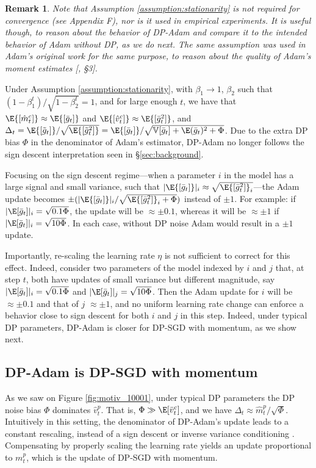 \documentclass[letterpaper]{article} %
\newtheorem*{remark}{Remark}
\def\V{\mathbb{V}}
\begin{document}
\begin{remark}
    Note that Assumption \ref{assumption:stationarity} is not required for convergence (see Appendix F), nor is it used in empirical experiments. It is useful though, to reason about the behavior of DP-Adam and compare it to the intended behavior of Adam without DP, as we do next. The same assumption was used in Adam's original work for the same purpose, to reason about the quality of Adam's moment estimates [\cite{orig_adam}, \S3].
\end{remark}

Under Assumption \ref{assumption:stationarity}, with $\beta_1 \rightarrow 1$, $\beta_2$ such that $(1-\beta_1^{t})/{\sqrt{1-\beta_2^{t}}} = 1$, and for large enough $t$, we have that $\E{[\hat{m}_t^{c}]} \approx \E{[\bar{g}_t]}$ and $\E{[\hat{v}_t^{c}]} \approx \E{[\bar{g}_t^{2}]}$, and $\Delta_t =
\E{[\tilde{g}_t]} / \sqrt{\E{[\tilde{g}_t^2]}} = \E{[\bar{g}_t]} / \sqrt{\V{[\bar{g}_t]+\E(\bar{g}_t)^2}+\Phi}$.
Due to the extra DP bias $\Phi$ in the denominator of Adam's estimator, DP-Adam no longer follows the sign descent interpretation seen in \S\ref{sec:background}.


Focusing on the sign descent regime---when a parameter $i$ in the model has a large signal and small variance, such that $|\E{[\bar{g}_t]}|_i \approx \sqrt{\E{[\bar{g}^2_t]}_i}$---the Adam update becomes $\pm (|\E{[\bar{g}_t]}|_i / \sqrt{\E{[\bar{g}^2_t]}_{i} + \Phi})$ instead of $\pm 1$.
%
For example: if $|\E[\bar{g}_t]|_i=\sqrt{0.1\Phi}$, the update will be $\approx \pm 0.1$, whereas it will be $\approx \pm 1$ if $|\E[\bar{g}_t]|_i=\sqrt{10\Phi}$. In each case, without DP noise Adam would result in a $\pm 1$ update.

Importantly, re-scaling the learning rate $\eta$ is not sufficient to correct for this effect. Indeed, consider two parameters of the model indexed by $i$ and $j$ that, at step $t$, both have updates of small variance but different magnitude, say $|\E[\bar{g}_t]|_i=\sqrt{0.1\Phi}$ and $|\E[\bar{g}_t]|_j=\sqrt{10\Phi}$.  Then the Adam update for $i$ will be $\approx \pm 0.1$ and that of $j$ $\approx \pm 1$, and no uniform learning rate change can enforce a behavior close to sign descent for both $i$ and $j$ in this step. Indeed, under typical DP parameters, DP-Adam is closer for DP-SGD with momentum, as we show next.

\subsection{DP-Adam is DP-SGD with momentum}
\label{sec:motiv-sgdm}
As we saw on Figure \ref{fig:motiv_10001}, under typical DP parameters the DP noise bias $\Phi$ dominates $\hat{v}^p_t$. That is, $\Phi \gg \E[\bar{v}^c_t]$, and we have $\Delta_t \approx \hat{m}^p_t / \sqrt{\Phi}$. Intuitively in this setting, the denominator of DP-Adam's update leads to a constant rescaling, instead of a sign descent \citep{kunstner2023heavytailed} or inverse variance conditioning \citep{balles2020dissecting}. Compensating by properly scaling the learning rate yields an update proportional to $m^p_t$, which is the update of DP-SGD with momentum.
\end{document}
